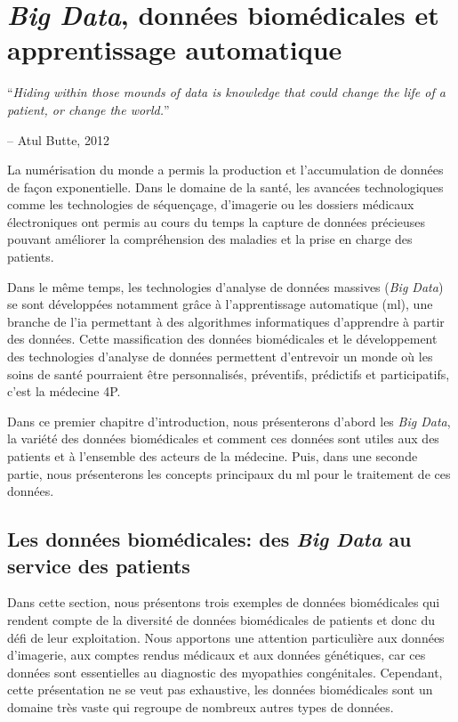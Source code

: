 \chapter{\textit{Big Data}, données biomédicales et apprentissage automatique}

\epigraph{\LARGE{``\textit{Hiding within those mounds of data is knowledge that could change the life of a patient, or change the world.}''}}{\LARGE{-- Atul Butte, 2012}}

La numérisation du monde a permis la production et l'accumulation de données de façon exponentielle. Dans le domaine de la santé, les avancées technologiques comme les technologies de séquençage, d'imagerie ou les dossiers médicaux électroniques ont permis au cours du temps la capture de données précieuses pouvant améliorer la compréhension des maladies et la prise en charge des patients.

Dans le même temps, les technologies d'analyse de données massives (\textit{Big Data}) se sont développées notamment grâce à l'apprentissage automatique (\gls{ml}), une branche de l'\gls{ia} permettant à des algorithmes informatiques d'apprendre à partir des données. Cette massification des données biomédicales et le développement des technologies d'analyse de données permettent d'entrevoir un monde où les soins de santé pourraient être personnalisés, préventifs, prédictifs et participatifs, c'est la médecine 4P.

Dans ce premier chapitre d'introduction, nous présenterons d'abord les \textit{Big Data}, la variété des données biomédicales et comment ces données sont utiles aux des patients et à l'ensemble des acteurs de la médecine. Puis, dans une seconde partie, nous présenterons les concepts principaux du \gls{ml} pour le traitement de ces données.

\section{Les données biomédicales: des \textit{Big Data} au service des patients}
Dans cette section, nous présentons trois exemples de données biomédicales qui rendent compte de la diversité de données biomédicales de patients et donc du défi de leur exploitation. Nous apportons une attention particulière aux données d'imagerie, aux comptes rendus médicaux et aux données génétiques, car ces données sont essentielles au diagnostic des myopathies congénitales. Cependant, cette présentation ne se veut pas exhaustive, les données biomédicales sont un domaine très vaste qui regroupe de nombreux autres types de données.

